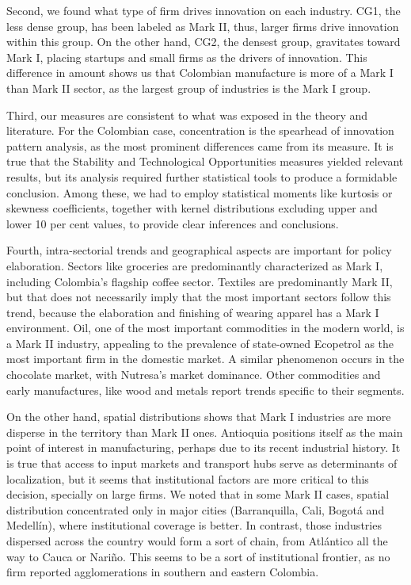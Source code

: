\documentclass[12pt,a4paper]{article}
\begin{document}
Second, we found what type of firm drives innovation on each industry. CG1, the less dense group, has been labeled as Mark II, thus, larger firms drive innovation within this group. On the other hand, CG2, the densest group, gravitates toward Mark I, placing startups and small firms as the drivers of innovation. This difference in amount shows us that Colombian manufacture is more of a Mark I than Mark II sector, as the largest group of industries is the Mark I group.  

Third, our measures are consistent to what was exposed in the theory and literature. For the Colombian case, concentration is the spearhead of innovation pattern analysis, as the most prominent differences came from its measure. It is true that the Stability and Technological Opportunities measures yielded relevant results, but its analysis required further statistical tools to produce a formidable conclusion. Among these, we had to employ statistical moments like kurtosis or skewness coefficients, together with kernel distributions excluding upper and lower 10 per cent values, to provide clear inferences and conclusions. 

Fourth, intra-sectorial trends and geographical aspects are important for policy elaboration. Sectors like groceries are predominantly characterized as Mark I, including Colombia’s flagship coffee sector. Textiles are predominantly Mark II, but that does not necessarily imply that the most important sectors follow this trend, because the elaboration and finishing of wearing apparel has a Mark I environment. Oil, one of the most important commodities in the modern world, is a Mark II industry, appealing to the prevalence of state-owned Ecopetrol as the most important firm in the domestic market. A similar phenomenon occurs in the chocolate market, with Nutresa's market dominance. Other commodities and early manufactures, like wood and metals report trends specific to their segments. 

On the other hand, spatial distributions shows that Mark I industries are more disperse in the territory than Mark II ones. Antioquia positions itself as the main point of interest in manufacturing, perhaps due to its recent industrial history. It is true that access to input markets and transport hubs serve as determinants of localization, but it seems that institutional factors are more critical to this decision, specially on large firms. We noted that in some Mark II cases, spatial distribution concentrated only in major cities (Barranquilla, Cali, Bogotá and Medellín), where institutional coverage is better. In contrast, those industries dispersed across the country would form a sort of chain, from Atlántico all the way to Cauca or Nariño. This seems to be a sort of institutional frontier, as no firm reported agglomerations in southern and eastern Colombia.
\end{document}
